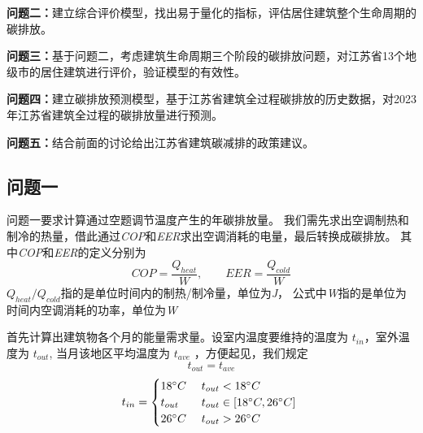 \documentclass[a4paper, 12pt]{article}
\numberwithin{equation}{section}
\begin{document}
            \textbf{问题二：}建立综合评价模型，找出易于量化的指标，评估居住建筑整个生命周期的碳排放。

            \textbf{问题三：}基于问题二，考虑建筑生命周期三个阶段的碳排放问题，对江苏省13个地级市的居住建筑进行评价，验证模型的有效性。

            \textbf{问题四：}建立碳排放预测模型，基于江苏省建筑全过程碳排放的历史数据，对2023年江苏省建筑全过程的碳排放量进行预测。

            \textbf{问题五：}结合前面的讨论给出江苏省建筑碳减排的政策建议。


    {}
        \subsection{问题一}
            问题一要求计算通过空题调节温度产生的年碳排放量。
            我们需先求出空调制热和制冷的热量，借此通过\textit{COP}和\textit{EER}求出空调消耗的电量，最后转换成碳排放。
            其中\textit{COP}和\textit{EER}的定义分别为
            \begin{equation}
                COP = \frac{Q_{heat}}{W},\hspace{2em} EER = \frac{Q_{cold}}{W}
            \end{equation}
            $ Q_{heat} / Q_{cold} $指的是单位时间内的制热/制冷量，单位为\textit{J}，
            公式中\textit{W}指的是单位为时间内空调消耗的功率，单位为\textit{W}

            首先计算出建筑物各个月的能量需求量。设室内温度要维持的温度为 $ t_{in} $，室外温度为 $ t_{out} $,
            当月该地区平均温度为 $ t_{ave} $ ，方便起见，我们规定
            \begin{equation*}
                t_{out} = t_{ave}
            \end{equation*}
            \begin{equation*}
                t_{in} =
                \begin{cases}
                    18 ^{\circ}C & \text{ $ t_{out} < 18 ^{\circ}C $ } \\
                    t_{out} & \text{ $ t_{out} \in [18 ^{\circ}C, 26 ^{\circ}C] $ } \\
                    26 ^{\circ}C & \text{ $ t_{out} > 26 ^{\circ}C $}
                \end{cases}
            \end{equation*}
\end{document}
